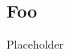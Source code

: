 \clearpage
\begin{appendices}
	\chapter{Foo \label{app:foo}}
	Placeholder
	
%
%
%


\end{appendices}
